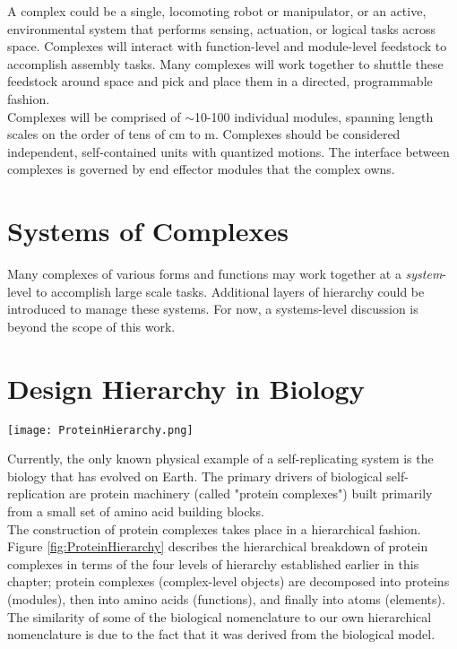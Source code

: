 {A complex could be a single, locomoting robot or manipulator, or an active, environmental system that performs sensing, actuation, or logical tasks across space.  Complexes will interact with function-level and module-level feedstock to accomplish assembly tasks.  Many complexes will work together to shuttle these feedstock around space and pick and place them in a directed, programmable fashion.\\

Complexes will be comprised of $\sim$10-100 individual modules, spanning length scales on the order of tens of cm to m.  Complexes should be considered independent, self-contained units with quantized motions.  The interface between complexes is governed by end effector modules that the complex owns.

\section{Systems of Complexes}

Many complexes of various forms and functions may work together at a \textit{system}-level to accomplish large scale tasks.  Additional layers of hierarchy could be introduced to manage these systems.  For now, a systems-level discussion is beyond the scope of this work.

\section{Design Hierarchy in Biology}\label{sec:biologyHierarchy}

\begin{sidewaysfigure}
  \texttt{[image: ProteinHierarchy.png]}
  \caption{Hierarchical breakdown of protein complexes (complexes) into proteins (modules), amino acids (functions), and atoms (elements).  3D renderings of protein complexes and subunits were made in \href{https://www.pymol.org/}{Pymol} using data from the RCSB Protein Data Bank \cite{UCSD/SDSC}.}
  \label{fig:ProteinHierarchy}
\end{sidewaysfigure}


Currently, the only known physical example of a self-replicating system is the biology that has evolved on Earth.  The primary drivers of biological self-replication are protein machinery (called "protein complexes") built primarily from a small set of amino acid building blocks.\\

The construction of protein complexes takes place in a hierarchical fashion.  Figure \ref{fig:ProteinHierarchy} describes the hierarchical breakdown of protein complexes in terms of the four levels of hierarchy established earlier in this chapter; protein complexes (complex-level objects) are decomposed into proteins (modules), then into amino acids (functions), and finally into atoms (elements).  The similarity of some of the biological nomenclature to our own hierarchical nomenclature is due to the fact that it was derived from the biological model.

}
